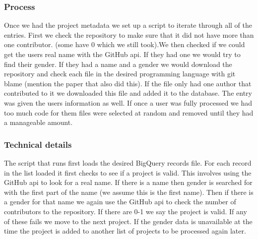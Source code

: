 \documentclass{article}
\begin{document}
\subsubsection{Process}
Once we had the project metadata we set up a script to iterate through all of the entries. First we check the repository to make sure that it did not have more than one contributor. (some have 0 which we still took).We then checked if we could get the users real name with the GitHub api. If they had one we would try to find their gender. If they had a name and a gender we would download the repository and check each file in the desired programming language with git blame (mention the paper that also did this). If the file only had one author that contributed to it we downloaded this file and added it to the database. The entry was given the users information as well. If once a user was fully processed we had too much code for them files were selected at random and removed until they had a manageable amount.

\subsubsection{Technical details}
The script that runs first loads the desired BigQuery records file. For each record in the list loaded it first checks to see if a project is valid. This involves using the GitHub api to look for a real name. If there is a name then gender is searched for with the first part of the name (we assume this is the first name). Then if there is a gender for that name we again use the GitHub api to check the number of contributors to the repository. If there are 0-1 we say the project is valid. If any of these fails we move to the next project. If the gender data is unavailable at the time the project is added to another list of projects to be processed again later.
\end{document}
